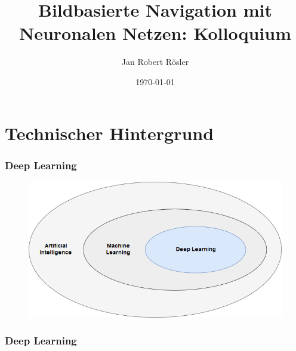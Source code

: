 \documentclass{beamer}
\title{Bildbasierte Navigation mit Neuronalen Netzen: Kolloquium}
\author{Jan Robert Rösler}
\date{\today}
\begin{document}
\maketitle

\frame{\tableofcontents}

\section{Technischer Hintergrund}

\frame{\tableofcontents[currentsection]}

\begin{frame} 
  \frametitle{Deep Learning} 

\begin{figure}
	\centering
	\includegraphics[width=.85\linewidth]{figures/Mengen.png}	 
	\label{img:menge}
\end{figure}

\end{frame}

\begin{frame} 
\frametitle{Deep Learning} 


\end{frame}
\end{document}
